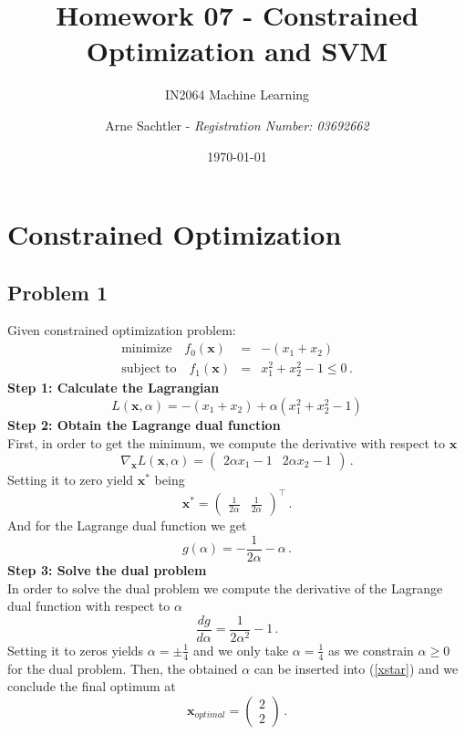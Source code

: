 \documentclass{scrartcl}
\title{Homework 07 - Constrained Optimization and SVM}
\author{Arne Sachtler - \textit{Registration Number: 03692662}}
\date{\today}
\subtitle{IN2064 Machine Learning}
\begin{document}
\maketitle

\section{Constrained Optimization}
\subsection{Problem 1}
Given constrained optimization problem:
\begin{eqnarray}
	\text{minimize}\quad f_0(\mathbf{x}) &=& -(x_1 + x_2)\\
	\text{subject to}\quad f_1(\mathbf{x}) &=& x_1^2 + x_2^2 - 1 \le 0 \, .
\end{eqnarray}
\textbf{Step 1: Calculate the Lagrangian}\\
\begin{equation}
	L(\bm{x}, \alpha) = -(x_1 + x_2) + \alpha (x_1^2 + x_2^2 - 1)
\end{equation}
\textbf{Step 2: Obtain the Lagrange dual function}\\
First, in order to get the minimum, we compute the derivative with respect to $\mathbf{x}$
\begin{equation}
	\nabla_\mathbf{x} L(\mathbf{x}, \alpha) = \begin{pmatrix}
		2 \alpha x_1 - 1 & 2 \alpha x_2 - 1
	\end{pmatrix} \, .
\end{equation}
Setting it to zero yield $\mathbf{x}^*$ being
\begin{equation}\label{xstar}
	\mathbf{x}^* = \begin{pmatrix}
		\frac{1}{2 \alpha} & \frac{1}{2 \alpha}
	\end{pmatrix}^\top \, .
\end{equation}
And for the Lagrange dual function we get
\begin{equation}
	g(\alpha) = -\frac{1}{2 \alpha} - \alpha \, .
\end{equation}
\textbf{Step 3: Solve the dual problem}\\
In order to solve the dual problem we compute the derivative of the Lagrange dual function with respect to $\alpha$
\begin{equation}
	\frac{dg}{d \alpha} = \frac{1}{2 \alpha^2} - 1 \, .
\end{equation}
Setting it to zeros yields $\alpha = \pm \frac{1}{4}$ and we only take $\alpha = \frac{1}{4}$ as we constrain $\alpha \ge 0$ for the dual problem.
Then, the obtained $\alpha$ can be inserted into (\ref{xstar}) and we conclude the final optimum at
\begin{equation}
	\mathbf{x}_{optimal} = \begin{pmatrix}
	2\\2
	\end{pmatrix} \, .
\end{equation}
\end{document}
